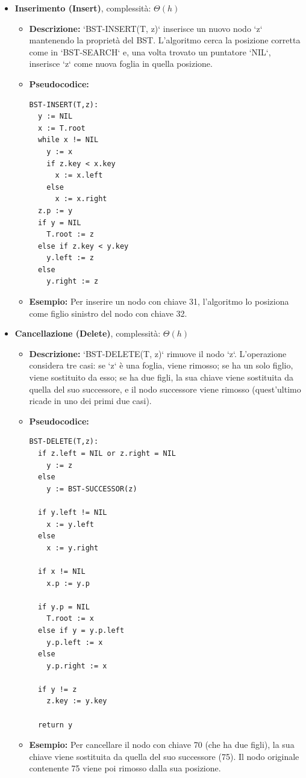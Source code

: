 \begin{itemize}
    \item \textbf{Inserimento (Insert)}, complessità: $\Theta(h)$
    \begin{itemize}
        \item \textbf{Descrizione:} `BST-INSERT(T, z)` inserisce un nuovo nodo `z` mantenendo la proprietà del BST. L'algoritmo cerca la posizione corretta come in `BST-SEARCH` e, una volta trovato un puntatore `NIL`, inserisce `z` come nuova foglia in quella posizione.
        \item \textbf{Pseudocodice:}
        \begin{verbatim}
BST-INSERT(T,z):
  y := NIL
  x := T.root
  while x != NIL
    y := x
    if z.key < x.key
      x := x.left
    else 
      x := x.right
  z.p := y
  if y = NIL
    T.root := z
  else if z.key < y.key
    y.left := z
  else 
    y.right := z
        \end{verbatim}
        \item \textbf{Esempio:} Per inserire un nodo con chiave 31, l'algoritmo lo posiziona come figlio sinistro del nodo con chiave 32.
    \end{itemize}

    \item \textbf{Cancellazione (Delete)}, complessità: $\Theta(h)$
    \begin{itemize}
        \item \textbf{Descrizione:} `BST-DELETE(T, z)` rimuove il nodo `z`. L'operazione considera tre casi: se `z` è una foglia, viene rimosso; se ha un solo figlio, viene sostituito da esso; se ha due figli, la sua chiave viene sostituita da quella del suo successore, e il nodo successore viene rimosso (quest'ultimo ricade in uno dei primi due casi).
        \item \textbf{Pseudocodice:}
        \begin{verbatim}
BST-DELETE(T,z):
  if z.left = NIL or z.right = NIL
    y := z
  else 
    y := BST-SUCCESSOR(z)
  
  if y.left != NIL
    x := y.left
  else 
    x := y.right

  if x != NIL
    x.p := y.p

  if y.p = NIL
    T.root := x
  else if y = y.p.left
    y.p.left := x
  else 
    y.p.right := x

  if y != z
    z.key := y.key
    
  return y
        \end{verbatim}
        \item \textbf{Esempio:} Per cancellare il nodo con chiave 70 (che ha due figli), la sua chiave viene sostituita da quella del suo successore (75). Il nodo originale contenente 75 viene poi rimosso dalla sua posizione.
    \end{itemize}
\end{itemize}